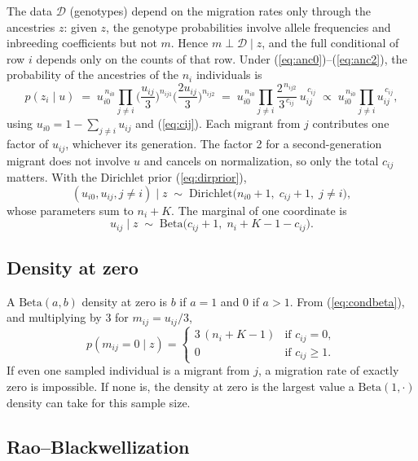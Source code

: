 \documentclass[11pt,a4paper]{article}
\newcommand{\data}{\mathcal{D}}
\newcommand{\Dir}{\mathrm{Dirichlet}}
\newcommand{\Beta}{\mathrm{Beta}}
\newcommand{\1}{\mathbf{1}}
\begin{document}
The data $\data$ (genotypes) depend on the migration rates only through the
ancestries $z$: given $z$, the genotype probabilities involve allele
frequencies and inbreeding coefficients but not $m$. Hence
$m \perp \data \mid z$, and the full conditional of row $i$ depends only on the
counts of that row. Under (\ref{eq:anc0})--(\ref{eq:anc2}), the probability of the
ancestries of the $n_i$ individuals is
\[
p(z_i \mid u) \;=\; u_{i0}^{\,n_{i0}}
\prod_{j\neq i} \Big(\frac{u_{ij}}{3}\Big)^{n_{ij1}} \Big(\frac{2u_{ij}}{3}\Big)^{n_{ij2}}
\;=\; u_{i0}^{\,n_{i0}} \prod_{j\neq i} \frac{2^{\,n_{ij2}}}{3^{\,c_{ij}}}\, u_{ij}^{\,c_{ij}}
\;\propto\; u_{i0}^{\,n_{i0}} \prod_{j\neq i} u_{ij}^{\,c_{ij}},
\]
using $u_{i0} = 1-\sum_{j\neq i}u_{ij}$ and (\ref{eq:cij}). Each migrant from
$j$ contributes one factor of $u_{ij}$, whichever its generation. The factor 2
for a second-generation migrant does not involve $u$ and cancels on
normalization, so only the total $c_{ij}$ matters. With the Dirichlet prior
(\ref{eq:dirprior}),
\begin{equation}
(u_{i0}, u_{ij}, j\neq i) \mid z \;\sim\; \Dir\big(n_{i0}+1,\; c_{ij}+1,\; j\neq i\big),
\end{equation}
whose parameters sum to $n_i+K$. The marginal of one coordinate is
\begin{equation}
u_{ij} \mid z \;\sim\; \Beta\big(c_{ij}+1,\; n_i+K-1-c_{ij}\big).
\label{eq:condbeta}
\end{equation}

\subsection{Density at zero}

A $\Beta(a,b)$ density at zero is $b$ if $a=1$ and $0$ if $a>1$. From
(\ref{eq:condbeta}), and multiplying by $3$ for $m_{ij}=u_{ij}/3$,
\begin{equation}
p(m_{ij}=0 \mid z) =
\begin{cases}
3\,(n_i+K-1) & \text{if } c_{ij}=0,\\
0 & \text{if } c_{ij}\ge 1.
\end{cases}
\label{eq:cond0}
\end{equation}
If even one sampled individual is a migrant from $j$, a migration rate of
exactly zero is impossible. If none is, the density at zero is the largest
value a $\Beta(1,\cdot)$ density can take for this sample size.

\subsection{Rao--Blackwellization}
\end{document}
